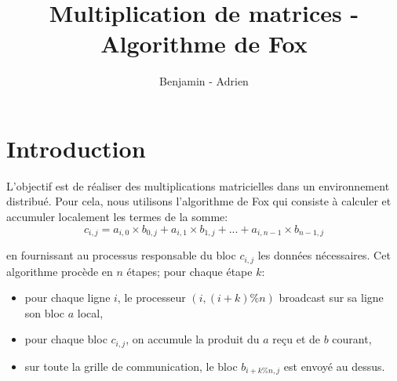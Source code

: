 \documentclass[12pt]{article}
\title{Multiplication de matrices - Algorithme de Fox}
\author{Benjamin \bsc{Angelaud} - Adrien \bsc{Guilbaud}}
\begin{document}
\maketitle

\section{Introduction}
L'objectif est de réaliser des multiplications matricielles dans un environnement distribué. Pour cela, nous utilisons l'algorithme de Fox qui consiste à calculer et accumuler localement les termes de la somme: 
$$c_{i,j} = a_{i,0} \times b_{0,j} + a_{i,1} \times b_{1,j} + ... + a_{i,n-1} \times b_{n-1,j} $$

en fournissant au processus responsable du bloc $c_{i,j}$ les données nécessaires. Cet algorithme procède en $n$ étapes; pour chaque étape $k$:
\begin{itemize}
\item pour chaque ligne $i$, le processeur $(i, (i+k)\%n)$ broadcast sur sa ligne son bloc $a$ local,
\item pour chaque bloc $c_{i,j}$, on accumule la produit du $a$ reçu et de $b$ courant,
\item sur toute la grille de communication, le bloc $b_{i+k\%n,j}$ est envoyé au dessus.
\end{itemize}
\end{document}
